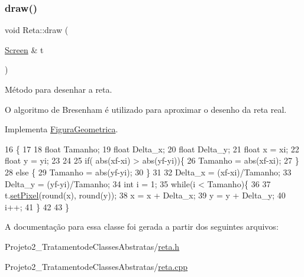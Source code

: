 \subsubsection{\texorpdfstring{draw()}{draw()}}
{\footnotesize\ttfamily void Reta\+::draw (\begin{DoxyParamCaption}\item[{\mbox{\hyperlink{class_screen}{Screen}} \&}]{t }\end{DoxyParamCaption})\hspace{0.3cm}{\ttfamily [virtual]}}



Método para desenhar a reta. 

O algoritmo de Bresenham é utilizado para aproximar o desenho da reta real. 

Implementa \mbox{\hyperlink{class_figura_geometrica_a8ee8dedc060b6059a805ea091aef2c41}{Figura\+Geometrica}}.


\begin{DoxyCode}
16                         \{
17 
18 \textcolor{keywordtype}{float} Tamanho;
19     \textcolor{keywordtype}{float} Delta\_x;
20     \textcolor{keywordtype}{float} Delta\_y;
21     \textcolor{keywordtype}{float} x = xi;
22     \textcolor{keywordtype}{float} y = yi;
23 
24 
25     \textcolor{keywordflow}{if}( abs(xf-xi) > abs(yf-yi))\{
26         Tamanho = abs(xf-xi);
27     \}
28     \textcolor{keywordflow}{else} \{
29         Tamanho = abs(yf-yi);
30     \}
31 
32     Delta\_x = (xf-xi)/Tamanho;
33     Delta\_y = (yf-yi)/Tamanho;
34     \textcolor{keywordtype}{int} i = 1;
35     \textcolor{keywordflow}{while}(i < Tamanho)\{
36 
37         t.\mbox{\hyperlink{class_screen_ae6bea81c57a22d226507c3c26fa95ee0}{setPixel}}(round(x), round(y));
38         x = x + Delta\_x;
39         y = y + Delta\_y;
40         i++;
41     \}
42 
43 \}
\end{DoxyCode}


A documentação para essa classe foi gerada a partir dos seguintes arquivos\+:\begin{DoxyCompactItemize}
\item 
Projeto2\+\_\+\+Tratamentode\+Classes\+Abstratas/\mbox{\hyperlink{reta_8h}{reta.\+h}}\item 
Projeto2\+\_\+\+Tratamentode\+Classes\+Abstratas/\mbox{\hyperlink{reta_8cpp}{reta.\+cpp}}\end{DoxyCompactItemize}
